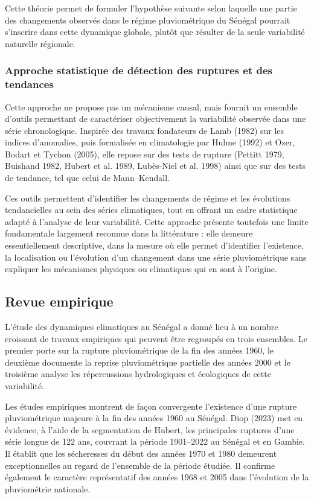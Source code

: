 Cette théorie permet de formuler l'hypothèse suivante selon laquelle une partie des changements observés dans le régime pluviométrique du Sénégal pourrait s'inscrire dans cette dynamique globale, plutôt que résulter de la seule variabilité naturelle régionale.

\subsubsection{Approche statistique de détection des ruptures et des tendances}

Cette approche ne propose pas un mécanisme causal, mais fournit un ensemble d’outils permettant de caractériser objectivement la variabilité observée dans une série chronologique. Inspirée des travaux fondateurs de Lamb (1982) sur les indices d’anomalies, puis formalisée en climatologie par Hulme (1992) et Ozer, Bodart et Tychon (2005), elle repose sur des tests de rupture (Pettitt 1979, Buishand 1982, Hubert et al. 1989, Lubès-Niel et al. 1998) ainsi que sur des tests de tendance, tel que celui de Mann–Kendall.

Ces outils permettent d’identifier les changements de régime et les évolutions tendancielles au sein des séries climatiques, tout en offrant un cadre statistique adapté à l’analyse de leur variabilité. Cette approche présente toutefois une limite fondamentale largement reconnue dans la littérature : elle demeure essentiellement descriptive, dans la mesure où elle permet d’identifier l’existence, la localisation ou l’évolution d’un changement dans une série pluviométrique sans expliquer les mécanismes physiques ou climatiques qui en sont à l’origine.

\subsection{Revue empirique}

L'étude des dynamiques climatiques au Sénégal a donné lieu à un nombre croissant de travaux empiriques qui peuvent être regroupés en trois ensembles. Le premier porte sur la rupture pluviométrique de la fin des années 1960, le deuxième documente la reprise pluviométrique partielle des années 2000 et le troisième analyse les répercussions hydrologiques et écologiques de cette variabilité.

Les études empiriques montrent de façon convergente l'existence d'une rupture pluviométrique majeure à la fin des années 1960 au Sénégal. Diop (2023) met en évidence, à l’aide de la segmentation de Hubert, les principales ruptures d’une série longue de 122 ans, couvrant la période 1901–2022 au Sénégal et en Gambie. Il établit que les sécheresses du début des années 1970 et 1980 demeurent exceptionnelles au regard de l’ensemble de la période étudiée. Il confirme également le caractère représentatif des années 1968 et 2005 dans l’évolution de la pluviométrie nationale.

